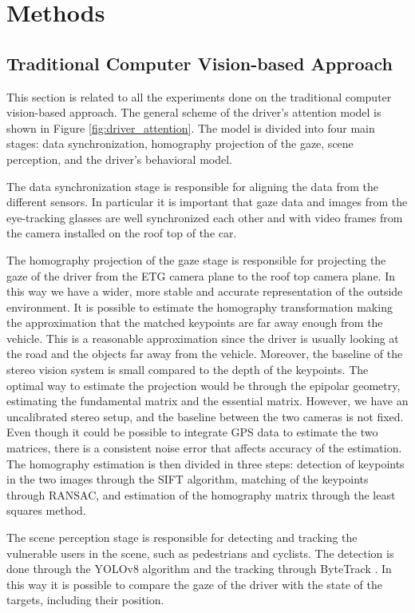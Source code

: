 \chapter{Methods}
\label{chpt:methods}

\section{Traditional Computer Vision-based Approach}
\label{sec:methods_traditional_cv}

This section is related to all the experiments done on the traditional computer 
vision-based approach. The general scheme of the driver's attention model is 
shown in Figure \ref{fig:driver_attention}. 
The model is divided into four main stages: data synchronization, homography 
projection of the gaze, scene perception, and the driver's behavioral model. 

The data synchronization stage is responsible for aligning the data from the 
different sensors. In particular it is important that gaze data and 
images from the 
eye-tracking glasses are well synchronized each other and with video frames 
from the camera installed on the roof top of the car.

The homography projection of the gaze stage is responsible for projecting the 
gaze of the driver from the ETG camera plane to the roof top camera plane.
In this way we have a wider, more stable and accurate representation of 
the outside environment.
It is possible to 
estimate the homography transformation making the approximation that the matched 
keypoints are far away enough from the vehicle. This is a reasonable 
approximation since the driver is usually looking at the road and the objects 
far away from the vehicle. Moreover, the baseline of the stereo vision system is 
small compared to the depth of the keypoints.
The optimal way to estimate the projection would be through the epipolar 
geometry, estimating the fundamental matrix and the essential matrix. 
However, we have an uncalibrated stereo setup, and the baseline between the two 
cameras is not fixed. Even though it could be possible to integrate GPS data 
to estimate the two matrices, there is a consistent noise error that affects 
accuracy of the estimation.
The homography estimation is then divided in three steps: detection of keypoints 
in the two images through the SIFT algorithm, matching of the keypoints through 
RANSAC, and estimation of the homography matrix through the least squares method.

The scene perception stage is responsible for detecting and tracking the vulnerable 
users in the scene, such as pedestrians and cyclists. The detection is done 
through the YOLOv8 algorithm \cite{yolo} and the tracking through ByteTrack
\cite{bytetrack}. In this way 
it is possible to compare the gaze of the driver with the state of the targets, 
including their position.

